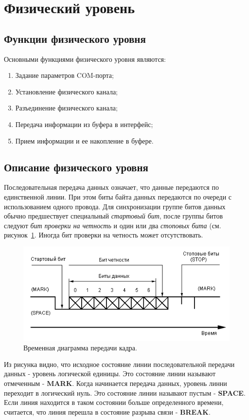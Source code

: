 \documentclass[russian,utf8,simple,emptystyle]{eskdtext}
\begin{document}
\section{Физический уровень}
\subsection{Функции физического уровня}
Основными функциями физического уровня являются:
\begin{enumerate}
\item Задание параметров COM-порта;
\item Установление физического канала;
\item Разъединение физического канала;
\item Передача информации из буфера в интерфейс;
\item Прием информации и ее накопление в буфере.
\end{enumerate}

\subsection{Описание физического уровня}
Последовательная передача данных означает, что данные передаются по единственной линии. При этом биты байта данных передаются по очереди с использованием одного провода. Для синхронизации группе битов данных обычно предшествует специальный \textit{стартовый бит}, после группы битов следуют \textit{бит проверки на четность} и один или два \textit{стоповых бита} (см. рисунок~\ref{fig:phys-level}. Иногда бит проверки на четность может отсутствовать.

\begin{figure}[h!]
\centering
\includegraphics[scale=1.0]{phys-level}
\caption{Временная диаграмма передачи кадра.}
\label{fig:phys-level}
\end{figure}

Из рисунка видно, что исходное состояние линии последовательной передачи данных - уровень логической единицы. Это состояние линии называют отмеченным - \textbf{MARK}. Когда начинается передача данных, уровень линни переходит в логический нуль. Это состояние линии называют пустым - \textbf{SPACE}. Если линия находится в таком состоянии больше определенного времени, считается, что линия перешла в состояние разрыва связи - \textbf{BREAK}.
\end{document}
